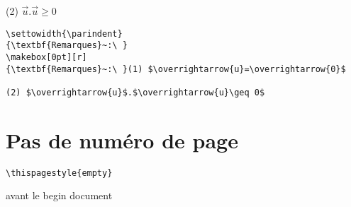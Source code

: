 \documentclass[12pt,french,oneside]{report}
\begin{document}
\begin{spacing}{1.2}
(2) $\overrightarrow{u}$.$\overrightarrow{u}\geq 0$

\begin{verbatim} 
\settowidth{\parindent}
{\textbf{Remarques}~:\ }
\makebox[0pt][r]
{\textbf{Remarques}~:\ }(1) $\overrightarrow{u}=\overrightarrow{0}$

(2) $\overrightarrow{u}$.$\overrightarrow{u}\geq 0$
\end{verbatim} 

\section{Pas de numéro de page}

\begin{verbatim}
\thispagestyle{empty}
\end{verbatim} avant le begin document


\end{spacing}
\end{document}

